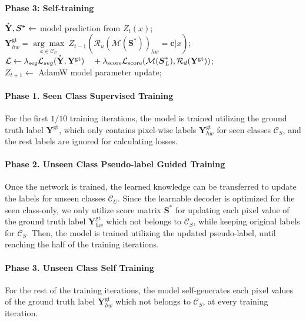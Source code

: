 \documentclass[nohyperref]{article}
\newcommand{\bs}{\boldsymbol}
\newcommand{\asty}{\accentset{\ast}{\mathbf{Y}}}
\newcommand{\gty}{\mbf{Y}^{\text{gt}}}
\newcommand{\mc}{\mathcal}
\newcommand{\mbf}{\mathbf}
\theoremstyle{plain}
\theoremstyle{definition}
\theoremstyle{remark}
\begin{document}
\begin{algorithm}
{\bfseries Phase 3: Self-training}

{
$\asty, \bs{S^{\ast}} \leftarrow$ model prediction from $Z_{t}(x)$; \\
\If{$\gty_{hw} \not\in \mc{C}_S$}
{$\gty_{hw} = \underset{\bs{c} \in \mc{C}_U}{\arg{\max}} \ Z_{t-1}(\mathcal{R}_{u}(\mathcal{M}(\bs{S^{\ast}}))_{hw} = \bs{c}|x)$;}
$ \mathcal{L} \leftarrow \lambda_{\text{seg}}\mathcal{L}_{seg}(\asty, \gty) \\ 
    {} \quad +\lambda_{\text{score}} \mathcal{L}_{\text{score}}(\mathcal{M}(\bs{S}^{\ast}_L),\mathcal{R}_{d}(\gty))$; \\
$Z_{t+1}\leftarrow$ AdamW model parameter update;
}   
\end{algorithm}


\paragraph{Phase 1. Seen Class Supervised Training}
For the first $1/10$ training iterations, the model is trained utilizing the ground truth label $\gty$, which only contains pixel-wise labels $\gty_{hw}$ for seen classes $\mc{C}_S$, and the rest labels are ignored for calculating losses. 

\paragraph{Phase 2. Unseen Class Pseudo-label Guided Training}
Once the network is trained, the learned knowledge can be transferred to update the labels for unseen classes $\mc{C}_U$. Since the learnable decoder is optimized for the seen class-only, we only utilize score matrix $\bs{S^{\ast}}$ for updating each pixel value of the ground truth label $\gty_{hw}$ which not belongs to $\mc{C}_S$, while keeping original labels for $\mc{C}_S$.
Then, the model is trained utilizing the updated pseudo-label, until reaching the half of the training iterations.

\paragraph{Phase 3. Unseen Class Self Training}
For the rest of the training iterations, the model self-generates each pixel values of the ground truth label $\gty_{hw}$ which not belongs to $\mc{C}_S$, at every training iteration.%
\end{document}
